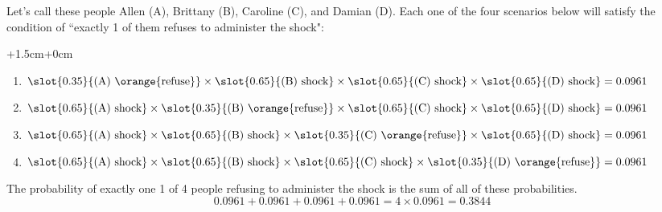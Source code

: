 \documentclass[slidestop,compress,mathserif]{beamer}
\begin{document}
\begin{frame}

\pause
Let's call these people Allen (A), Brittany (B), Caroline (C), and Damian (D). Each one of the four scenarios below will satisfy the condition of ``exactly 1 of them refuses to administer the shock": \\
\vspace{0.25cm}
\pause
\begin{changemargin}{+1.5cm}{+0cm}
{\footnotesize
\begin{enumerate}
\item[Scenario 1:] $\slot{0.35}{\text{(A) \orange{refuse}}} \times \slot{0.65}{\text{(B) shock}} \times \slot{0.65}{\text{(C) shock}} \times \slot{0.65}{\text{(D) shock}} = 0.0961$
\pause
\item[Scenario 2:] $\slot{0.65}{\text{(A) shock}} \times \slot{0.35}{\text{(B) \orange{refuse}}}\times \slot{0.65}{\text{(C) shock}} \times \slot{0.65}{\text{(D) shock}} = 0.0961$
\pause
\item[Scenario 3:] $\slot{0.65}{\text{(A) shock}} \times \slot{0.65}{\text{(B) shock}} \times \slot{0.35}{\text{(C) \orange{refuse}}}\times \slot{0.65}{\text{(D) shock}} = 0.0961$
\pause
\item[Scenario 4:] $\slot{0.65}{\text{(A) shock}} \times \slot{0.65}{\text{(B) shock}} \times \slot{0.65}{\text{(C) shock}} \times \slot{0.35}{\text{(D) \orange{refuse}}} = 0.0961$
\end{enumerate}
}
\end{changemargin}
\pause
The probability of exactly one 1 of 4 people refusing to administer the shock is the sum of all of these probabilities.
\[ 0.0961+ 0.0961 + 0.0961 + 0.0961 = 4 \times 0.0961 = 0.3844 \]

\end{frame}

\end{document}
